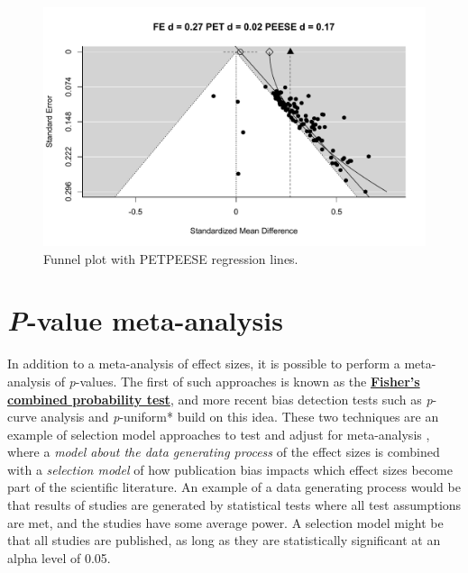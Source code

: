 \documentclass[
  oneside]{krantz}
\begin{document}
\begin{figure}

{\centering \includegraphics[width=1\linewidth]{12-bias_files/figure-latex/petpeese-1} 

}

\caption{Funnel plot with PETPEESE regression lines.}\label{fig:petpeese}
\end{figure}

\hypertarget{p-value-meta-analysis}{%
\section{\texorpdfstring{\emph{P}-value meta-analysis}{P-value meta-analysis}}\label{p-value-meta-analysis}}

In addition to a meta-analysis of effect sizes, it is possible to perform a meta-analysis of \emph{p}-values. The first of such approaches is known as the \href{https://en.wikipedia.org/wiki/Fisher\%27s_method}{\textbf{Fisher's combined probability test}}, and more recent bias detection tests such as \emph{p}-curve analysis \citep{simonsohn_p-curve_2014} and \emph{p}-uniform* \citep{aert_correcting_2018} build on this idea. These two techniques are an example of selection model approaches to test and adjust for meta-analysis \citep{iyengar_selection_1988}, where a \emph{model about the data generating process} of the effect sizes is combined with a \emph{selection model} of how publication bias impacts which effect sizes become part of the scientific literature. An example of a data generating process would be that results of studies are generated by statistical tests where all test assumptions are met, and the studies have some average power. A selection model might be that all studies are published, as long as they are statistically significant at an alpha level of 0.05.
\end{document}
